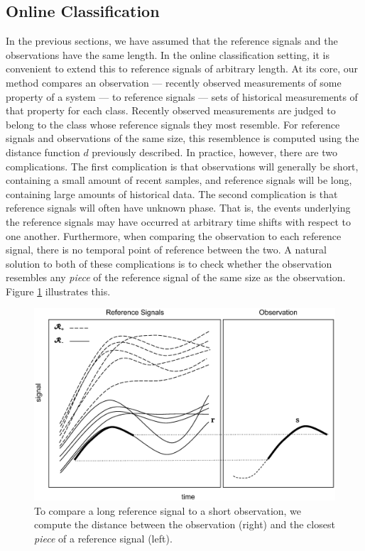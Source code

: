 \subsection{Online Classification}
In the previous sections, we have assumed that the reference signals and the
observations have the same length. In the online classification setting, it is
convenient to extend this to reference signals of arbitrary length. At its core,
our method compares an observation --- recently observed measurements of some
property of a system --- to reference signals --- sets of historical
measurements of that property for each class. Recently observed measurements are
judged to belong to the class whose reference signals they most resemble. For
reference signals and observations of the same size, this resemblence is
computed using the distance function $d$ previously described. In practice,
however, there are two complications. The first complication is that
observations will generally be short, containing a small amount of recent
samples, and reference signals will be long, containing large amounts of
historical data. The second complication is that reference signals will often
have unknown phase. That is, the events underlying the reference signals may
have occurred at arbitrary time shifts with respect to one another. Furthermore,
when comparing the observation to each reference signal, there is no temporal
point of reference between the two. A natural solution to both of these
complications is to check whether the observation resembles any {\em piece} of
the reference signal of the same size as the observation. Figure
\ref{fig:mindist} illustrates this.
\begin{figure}
\begin{center}
\includegraphics[width=6in]{mindist}
\end{center}
\caption{\label{fig:mindist} To compare a long reference signal to a short
  observation, we compute the distance between the observation (right) and the
  closest {\em piece} of a reference signal (left).}
\end{figure}

